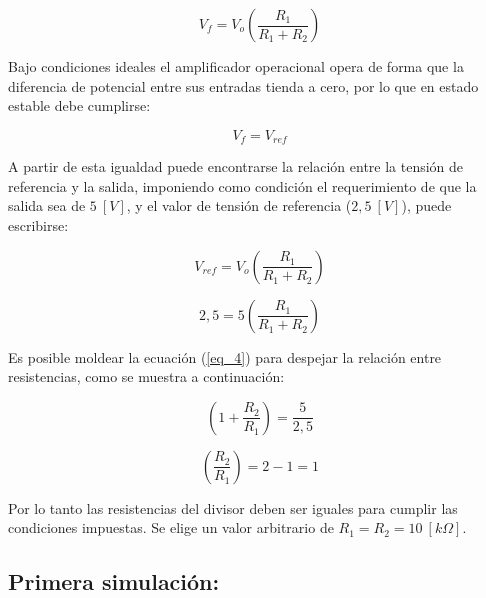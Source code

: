 \documentclass[12pt,a4paper]{article}
\begin{document}
\begin{equation}
    \label{eq_1}
    V_f = V_o \left(\frac{R_1}{R_1 + R_2}\right)
\end{equation}
\hspace{0.5 cm}

Bajo condiciones ideales el amplificador operacional  opera de forma que la diferencia de potencial entre sus entradas tienda a cero, por lo que en estado estable debe cumplirse:

\begin{equation}
    \label{eq_2}
    V_f = V_{ref}
\end{equation}
\hspace{0.5 cm}

A partir de esta igualdad puede encontrarse la relación entre la tensión de referencia y la salida, imponiendo como condición el requerimiento de que la salida sea de $5~[V]$, y el valor de tensión de referencia ($2,5~[V]$), puede escribirse:

\begin{equation}
    \label{eq_3}
    V_{ref} = V_o \left(\frac{R_1}{R_1 + R_2}\right)
\end{equation}

\begin{equation}
    \label{eq_4}
    2,5 = 5 \left(\frac{R_1}{R_1 + R_2}\right)
\end{equation}
\hspace{0.5 cm}

Es posible moldear la ecuación (\ref{eq_4}) para despejar la relación entre resistencias, como se muestra a continuación:

\begin{equation}
    \label{eq_5}
    \left(1+\frac{R_2}{R_1}\right) = \frac{5}{2,5} 
\end{equation}

\begin{equation}
    \label{eq_6}
    \left(\frac{R_2}{R_1}\right) = 2-1 = 1 
\end{equation}
\hspace{0.5 cm}

Por lo tanto las resistencias del divisor deben ser iguales para cumplir las condiciones impuestas. Se elige un valor arbitrario de $R_1 = R_2 = 10~[k\Omega]$.
\\

\subsection{Primera simulación:}
\end{document}
